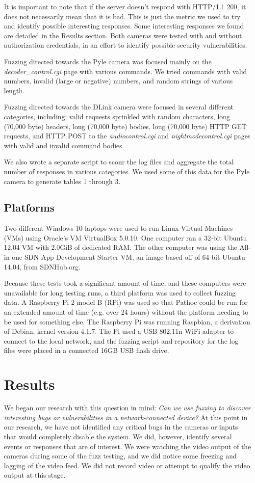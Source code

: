 \documentclass[letterpaper,twocolumn,10pt]{article}
\begin{document}
It is important to note that if the server doesn't respond with HTTP/1.1 200, it does not necessarily mean that it is bad. This is just the metric we used to try and identify possible interesting responses. Some interesting responses we found are detailed in the Results section. Both cameras were tested with and without authorization credentials, in an effort to identify possible security vulnerabilities. 

Fuzzing directed towards the Pyle camera was focused mainly on the \textit{decoder\_control.cgi} page with various commands. We tried commands with valid numbers, invalid (large or negative) numbers, and random strings of various length. 

Fuzzing directed towards the DLink camera were focused in several different categories, including: valid requests sprinkled with random characters, long (70,000 byte) headers, long (70,000 byte) bodies, long (70,000 byte) HTTP GET requests, and HTTP POST to the \textit{audiocontrol.cgi} and \textit{nightmodecontrol.cgi} pages with valid and invalid command bodies. 

We also wrote a separate script to scour the log files and aggregate the total number of responses in various categories. We used some of this data for the Pyle camera to generate tables 1 through 3. 


\subsection{Platforms}
Two different Windows 10 laptops were used to run Linux Virtual Machines (VMs) using Oracle's VM VirtualBox 5.0.10. One computer ran a 32-bit Ubuntu 12.04 VM with 2.0GiB of dedicated RAM. The other computer was using the All-in-one SDN App Development Starter VM, an image based off of 64-bit Ubuntu 14.04, from SDNHub.org.

Because these tests took a significant amount of time, and these computers were unavailable for long testing runs, a third platform was used to collect fuzzing data. A Raspberry Pi 2 model B (RPi) was used so that Pathoc could be run for an extended amount of time (e.g. over 24 hours) without the platform needing to be used for something else. The Raspberry Pi was running Raspbian, a derivation of Debian, kernel version 4.1.7. The Pi used a USB 802.11n WiFi adapter to connect to the local network, and the fuzzing script and repository for the log files were placed in a connected 16GB USB flash drive.


\section{Results}
We began our research with this question in mind: \textit{Can we use fuzzing to discover interesting bugs or vulnerabilities in a network-connected device?} At this point in our research, we have not identified any critical bugs in the cameras or inputs that would completely disable the system. We did, however, identify several events or responses that are of interest. We were watching the video output of the cameras during some of the fuzz testing, and we did notice some freezing and lagging of the video feed. We did not record video or attempt to qualify the video output at this stage. 
\end{document}
